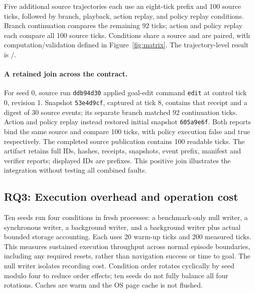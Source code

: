 \documentclass[10pt]{article}
\newcommand{\studyinput}[1]{}
\begin{document}
Five additional source trajectories each use an eight-tick prefix and 100 source
ticks, followed by branch, playback, action replay, and policy replay conditions.
Branch continuation compares the remaining 92 ticks; action and policy replay
each compare all 100 source ticks.
Conditions share a source and are paired, with computation/validation defined
in Figure~\ref{fig:matrix}.
The trajectory-level result is \ReplayPassed{}/\ReplayDeclared{}.

\paragraph{A retained join across the contract.}
For seed 0, source run \texttt{ddb94d30} applied goal-edit command \texttt{edit}
at control tick 0, revision 1. Snapshot \texttt{53e4d9cf}, captured at tick 8,
contains that receipt and a digest of 30 source events; its separate branch
matched 92 continuation ticks. Action and policy replay instead restored
initial snapshot \texttt{605a9e6f}. Both reports bind the same source and compare
100 ticks, with policy execution false and true respectively. The completed
source publication contains 100 readable ticks. The artifact retains full IDs,
hashes, receipts, snapshots, event prefix, manifest and verifier reports;
displayed IDs are prefixes. This positive join illustrates the integration
without testing all combined faults.

\begin{table}[t]
\centering\small
\caption{Continuation and replay outcomes under the frozen comparison policy.
Counts refer to source/restored pairs or source trajectories, never individual
ticks. Executed computation constrains the interpretation of agreement.}
\label{tab:replay}\studyinput{replay-table}
\end{table}

\subsection{RQ3: Execution overhead and operation cost}
Ten seeds run four conditions in fresh processes: a benchmark-only null writer,
a synchronous writer, a background writer, and a background writer plus actual
bounded storage accounting. Each uses 20 warm-up ticks and 200 measured ticks.
This measures sustained execution throughput across normal episode boundaries,
including any required resets, rather than navigation success or time to goal.
The null writer isolates recording cost.
Condition order rotates cyclically by seed modulo four to reduce order
effects; ten seeds do not fully balance all four rotations.
Caches are warm and the OS page cache is not flushed.
\end{document}
